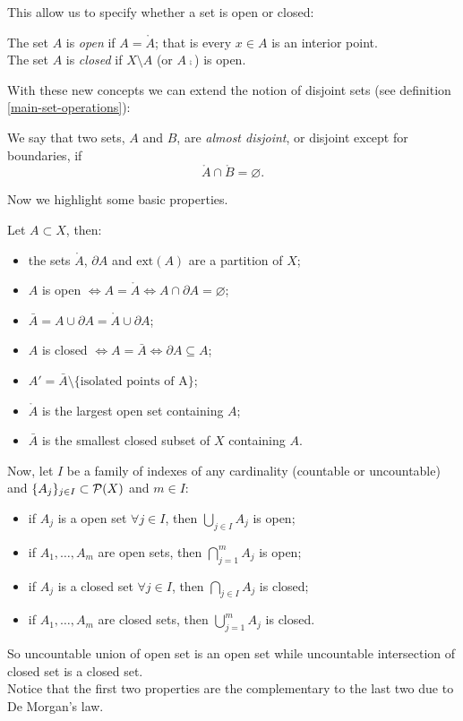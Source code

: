 This allow us to specify whether a set is open or closed:
\begin{defn}\label{open-close-set-metric-spaces}
	The set $A$ is \emph{open} if $A=\mathring{A}$; that is every $x\in A$ is an interior point.\\
	The set $A$ is \emph{closed} if $X\setminus A$ (or $A\comp$) is open.
\end{defn}

With these new concepts we can extend the notion of disjoint sets (see definition \vref{main-set-operations}):
\begin{defn}
	We say that two sets, $A$ and $B$, are \emph{almost disjoint}, or disjoint except for boundaries, if $$\mathring{A}\cap \mathring{B} = \varnothing.$$
\end{defn}

Now we highlight some basic properties.
\begin{prop} \label{topological-properties-of-sets}
	Let $A \subset X$, then:
	\begin{itemize}
		\item the sets $\mathring{A}$, $\partial A$ and $\text{ext}\left(A\right)$ are a partition of $X$;
		\item $A$ is open $\iff A=\mathring{A} \iff A \cap \partial A = \varnothing$;
		\item $\bar{A}= A \cup \partial A = \mathring{A} \cup \partial A$;
		\item $A$ is closed $\iff A=\bar{A} \iff \partial A \subseteq A$;
		\item $A'=\bar{A}\setminus \{\text{isolated points of A}\}$;
		\item $\mathring{A}$ is the largest open set containing $A$;
		\item $\bar{A}$ is the smallest closed subset of $X$ containing $A$.
	\end{itemize}
\end{prop}

\begin{prop} \label{topological-properties-of-families-of-sets}
	Now, let $I$ be a family of indexes of any cardinality (countable or uncountable) and $\{A_j\}_{j \in I} \subset \mathcal P(X)$ and  $m \in I$:
	\begin{itemize}
		\item if $A_j$ is a open set $\forall j \in I$, then $\bigcup_{j\in I} A_j$ is open;
		\item if $A_1, \ldots, A_m$ are open sets, then $\bigcap_{j=1}^m A_j$ is open;
		\item if $A_j$ is a closed set $\forall j \in I$, then $\bigcap_{j\in I} A_j$ is closed;
		\item if $A_1, \ldots, A_m$ are closed sets, then $\bigcup_{j=1}^m A_j$ is closed.
	\end{itemize}
\end{prop}
So uncountable union of open set is an open set while uncountable intersection of closed set is a closed set.\\
Notice that the first two properties are the complementary to the last two due to De Morgan's law.

